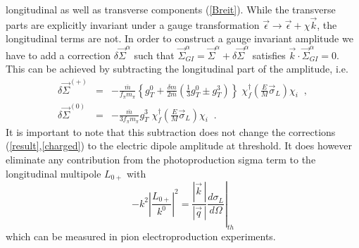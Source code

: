 longitudinal as well as transverse components (\ref{Breit}). While the 
transverse parts are explicitly invariant under a gauge transformation
$\vec{\epsilon} \to \vec{\epsilon} +\chi\vec{k}$, the longitudinal terms
are not.  In order to
construct a gauge invariant amplitude we have to add a correction $\delta
\vec{\Sigma}^\alpha$ such that $\vec{\Sigma}^\alpha_{\scriptscriptstyle GI}=
\vec{\Sigma}^\alpha + \delta\vec{\Sigma}^\alpha$ satisfies $\vec{k}\cdot
\vec{\Sigma}_{\scriptscriptstyle GI}^\alpha =0$. This can be achieved by 
subtracting the longitudinal part of the amplitude, i.e.
\alpheqn
\begin{eqnarray}
\delta\vec{\Sigma}^{(+)} &=&-\frac{\overline{m}}{f_\pi m_\pi}
\left\{ g_T^0 +\frac{\delta m}{2\overline{m}} \left( \frac{1}{3}g_T^0
\pm g_T^3 \right)
 \right\}\; \chi^\dagger_f \left(\frac{E}{M} \vec{\sigma}_L \right)
  \chi_i  \;\; , \\
\delta\vec{\Sigma}^{(0)} &=& -\frac{\overline{m}}{3 f_\pi m_\pi}
  g_T^3 \; \chi_f^{\dagger} \left(\frac{E}{M} \vec{\sigma}_L \right) \chi_i
  \;\; .
\end{eqnarray}
\reseteqn 
It is important to note that this subtraction does not change the 
corrections (\ref{result},\ref{charged}) to the electric dipole amplitude at
threshold.  It does
however eliminate any contribution from the photoproduction sigma term 
to the longitudinal multipole $L_{0+}$ with
\begin{equation}
-k^2 \left| \frac{L_{0+}}{k^0} \right|^2 =\left. \frac{|\vec{k}\,|}{|\vec{q}\,|}
\frac{d\sigma_L}{d\Omega} \right|_{th}
\end{equation}
which can be measured in pion electroproduction experiments. 
    
   
